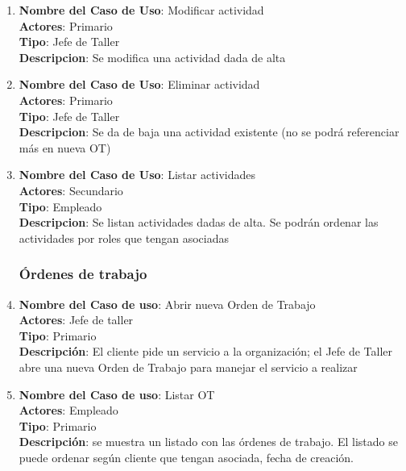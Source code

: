 \documentclass[12pt]{extarticle}
\begin{document}
\begin{spacing}{1.2}
\begin{enumerate}
            \item 	\textbf{Nombre del Caso de Uso}: Modificar actividad\\
                    \textbf{Actores}: Primario\\
                    \textbf{Tipo}: Jefe de Taller\\
                    \textbf{Descripcion}: Se modifica una actividad dada de alta

            \item 	\textbf{Nombre del Caso de Uso}: Eliminar actividad\\
                    \textbf{Actores}: Primario\\
                    \textbf{Tipo}: Jefe de Taller\\
                    \textbf{Descripcion}: Se da de baja una actividad existente (no se podrá referenciar más en nueva OT)

            \item 	\textbf{Nombre del Caso de Uso}: Listar actividades\\
                    \textbf{Actores}: Secundario\\
                    \textbf{Tipo}: Empleado\\
                    \textbf{Descripcion}: Se listan actividades dadas de alta. Se podrán ordenar las actividades por roles que tengan asociadas



            \subsubsection{Órdenes de trabajo}



            \item 	\textbf{Nombre del Caso de uso}: Abrir nueva Orden de Trabajo\\
                    \textbf{Actores}: Jefe de taller\\
                    \textbf{Tipo}: Primario\\
                    \textbf{Descripción}: El cliente pide un servicio a la organización; el Jefe de Taller abre una nueva Orden de Trabajo para manejar el servicio a realizar

            \item 	\textbf{Nombre del Caso de uso}: Listar OT\\
                    \textbf{Actores}: Empleado\\
                    \textbf{Tipo}: Primario\\
                    \textbf{Descripción}: se muestra un listado con las órdenes de trabajo. El listado se puede ordenar según cliente que tengan asociada, fecha de creación.


\end{enumerate}
\end{spacing}
\end{document}
